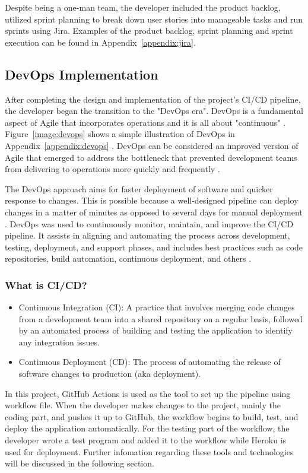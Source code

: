 Despite being a one-man team, the developer included the product backlog, utilized sprint planning to break down user stories into manageable tasks and run sprints using Jira. Examples of the product backlog, sprint planning and sprint execution can be found in Appendix~\ref{appendix:jira}.

\subsection{DevOps Implementation}
After completing the design and implementation of the project's CI/CD pipeline, the developer began the transition to the "DevOps era". DevOps is a fundamental aspect of Agile that incorporates operations and it is all about "continuous" \cite{vsd, mitesh}. Figure~\ref{image:devops} shows a simple illustration of DevOps in Appendix~\ref{appendix:devops} \cite{os}. DevOps can be considered an improved version of Agile that emerged to address the bottleneck that prevented development teams from delivering to operations more quickly and frequently \cite{hlrf}.

The DevOps approach aims for faster deployment of software and quicker response to changes. This is possible because a well-designed pipeline can deploy changes in a matter of minutes as opposed to several days for manual deployment \cite{joakim, khdwf}. DevOps was used to continuously monitor, maintain, and improve the CI/CD pipeline. It assists in aligning and automating the process across development, testing, deployment, and support phases, and includes best practices such as code repositories, build automation, continuous deployment, and others \cite{spj}. 

\subsubsection{What is CI/CD? \cite{sander, nikhil}}

\begin{itemize}
\item Continuous Integration (CI): A practice that involves merging code changes from a development team into a shared repository on a regular basis, followed by an automated process of building and testing the application to identify any integration issues.
\item Continuous Deployment (CD): The process of automating the release of software changes to production (aka deployment).
\end{itemize}

In this project, GitHub Actions is used as the tool to set up the pipeline using workflow file. When the developer makes changes to the project, mainly the coding part, and pushes it up to GitHub, the workflow begins to build, test, and deploy the application automatically. For the testing part of the workflow, the developer wrote a test program and added it to the workflow while Heroku is used for deployment. Further infomation regarding these tools and technologies will be discussed in the following section.